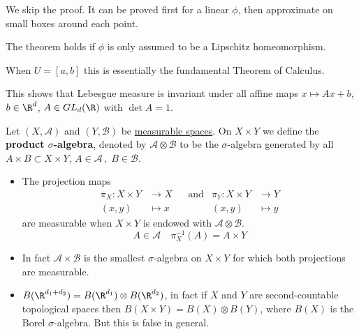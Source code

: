 \documentclass{article}
\newcommand{\1}[1]{\mathbbm{1}_{#1}}
\begin{document}
\begin{remark}
    \begin{enumerate}
    We skip the proof. It can be proved first for a linear $\phi$, then approximate on small boxes around each point.

    The theorem holds if $\phi$ is only assumed to be a Lipschitz homeomorphism.

    When $U = [a, b]$ this is essentially the fundamental Theorem of Calculus.

    This shows that Lebesgue measure is invariant under all affine maps $x \mapsto Ax + b$, $b \in \R^d$, $A \in GL_d(\R)$ with $\det A = 1$.
    \end{enumerate}
\end{remark}

\begin{defi}
    Let $(X, \mathcal{A})$ and $(Y, \mathcal{B})$ be \hyperlink{def:measurableSpace}{measurable spaces}.
    On $X \times Y$ we define the \textbf{product $\sigma$-algebra}, denoted by $\mathcal{A} \otimes \mathcal{B}$ to be the $\sigma$-algebra generated by all $A \times B \subset X \times Y$, $A \in \mathcal{A}\, , \; B \in \mathcal{B}$.
\end{defi}

\begin{remark}
    \begin{itemize}
        \item The projection maps
            \begin{align*}
                \pi_X: X \times Y &\to X & &\text{and} & \pi_Y: X \times Y &\to Y \\
                (x, y) &\mapsto x &&& (x, y) &\mapsto y
            \end{align*}
            are measurable when $X \times Y$ is endowed with $\mathcal{A} \otimes \mathcal{B}$.
            \begin{equation*}A \in \mathcal{A} \quad \pi_X^{-1} (A) = A \times Y
            \end{equation*}
        \item In fact $\mathcal{A} \times \mathcal{B}$ is the smallest $\sigma$-algebra on $X \times Y$ for which both projections are measurable.
        \item $B(\R^{d_1 + d_2}) = B(\R^{d_1}) \otimes B(\R^{d_2})$, in fact if $X$ and $Y$ are second-countable topological spaces then $B(X \times Y) = B(X) \otimes B(Y)$, where $B(X)$ is the Borel $\sigma$-algebra. But this is false in general.
    \end{itemize}
\end{remark}
\end{document}
